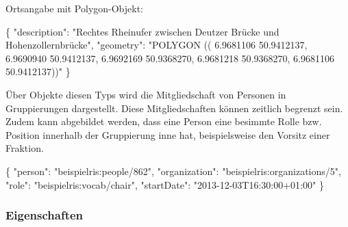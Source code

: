 \documentclass[,a4paper]{article}
\newenvironment{Shaded}{}{}
\newcommand{\DataTypeTok}[1]{\textcolor[rgb]{0.56,0.13,0.00}{{#1}}}
\newcommand{\StringTok}[1]{\textcolor[rgb]{0.25,0.44,0.63}{{#1}}}
\newcommand{\FunctionTok}[1]{\textcolor[rgb]{0.02,0.16,0.49}{{#1}}}
\begin{document}
Ortsangabe mit Polygon-Objekt:

\begin{Shaded}
\begin{Highlighting}[]
\FunctionTok{\{}
    \DataTypeTok{"description"}\FunctionTok{:} \StringTok{"Rechtes Rheinufer zwischen Deutzer}
\StringTok{        Brücke und Hohenzollernbrücke"}\FunctionTok{,}
    \DataTypeTok{"geometry"}\FunctionTok{:} \StringTok{"POLYGON ((}
\StringTok{                6.9681106 50.9412137,}
\StringTok{                6.9690940 50.9412137,}
\StringTok{                6.9692169 50.9368270,}
\StringTok{                6.9681218 50.9368270,}
\StringTok{                6.9681106 50.9412137))"}
\FunctionTok{\}}
\end{Highlighting}
\end{Shaded}


Über Objekte diesen Typs wird die Mitgliedschaft von Personen in
Gruppierungen dargestellt. Diese Mitgliedschaften können zeitlich
begrenzt sein. Zudem kann abgebildet werden, dass eine Person eine
besimmte Rolle bzw. Position innerhalb der Gruppierung inne hat,
beispielsweise den Vorsitz einer Fraktion.

\begin{Shaded}
\begin{Highlighting}[]
\FunctionTok{\{}
    \DataTypeTok{"person"}\FunctionTok{:} \StringTok{"beispielris:people/862"}\FunctionTok{,}
    \DataTypeTok{"organization"}\FunctionTok{:} \StringTok{"beispielris:organizations/5"}\FunctionTok{,}
    \DataTypeTok{"role"}\FunctionTok{:} \StringTok{"beispielris:vocab/chair"}\FunctionTok{,}
    \DataTypeTok{"startDate"}\FunctionTok{:} \StringTok{"2013-12-03T16:30:00+01:00"}
\FunctionTok{\}}
\end{Highlighting}
\end{Shaded}

\subsubsection{Eigenschaften}\label{eigenschaften-10}
\end{document}
